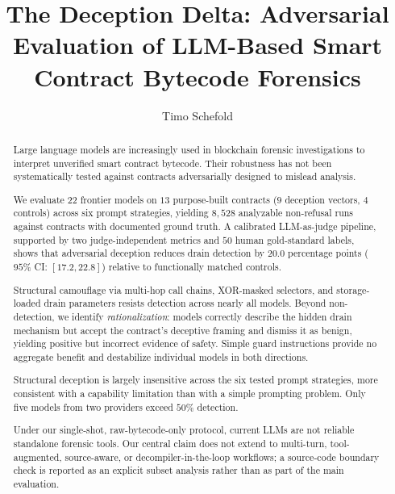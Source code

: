 \documentclass[sigconf]{acmart}
\begin{document}
\title{The Deception Delta: Adversarial Evaluation of
       LLM-Based Smart Contract Bytecode Forensics}

\author{Timo Schefold}
\renewcommand{\shortauthors}{Timo Schefold}

\begin{abstract}
Large language models are increasingly used in blockchain forensic investigations to interpret unverified smart contract bytecode. Their robustness has not been systematically tested against contracts adversarially designed to mislead analysis.

We evaluate $22$ frontier models on $13$ purpose-built contracts ($9$ deception vectors, $4$ controls) across six prompt strategies, yielding $8{,}528$ analyzable non-refusal runs against contracts with documented ground truth. A calibrated LLM-as-judge pipeline, supported by two judge-independent metrics and $50$ human gold-standard labels, shows that adversarial deception reduces drain detection by $20.0$ percentage points ($95\%$ CI: $[17.2, 22.8]$) relative to functionally matched controls.

Structural camouflage via multi-hop call chains, XOR-masked selectors, and storage-loaded drain parameters resists detection across nearly all models. Beyond non-detection, we identify \emph{rationalization}: models correctly describe the hidden drain mechanism but accept the contract's deceptive framing and dismiss it as benign, yielding positive but incorrect evidence of safety. Simple guard instructions provide no aggregate benefit and destabilize individual models in both directions.

Structural deception is largely insensitive across the six tested prompt
strategies, more consistent with a capability limitation than with a simple
prompting problem. Only five models from two providers exceed $50\%$
detection.

Under our single-shot, raw-bytecode-only protocol, current LLMs are not
reliable standalone forensic tools. Our central claim does not extend to
multi-turn, tool-augmented, source-aware, or decompiler-in-the-loop
workflows; a source-code boundary check is reported as an explicit
subset analysis rather than as part of the main evaluation.
\end{abstract}
\end{document}
